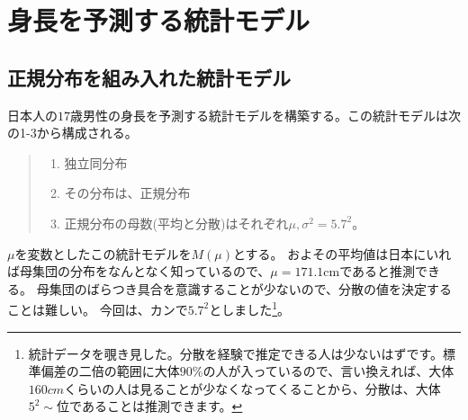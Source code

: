 
\chapter{身長を予測する統計モデル}
\section{正規分布を組み入れた統計モデル}
日本人の$17$歳男性の身長を予測する統計モデルを構築する。この統計モデルは次の1-3から構成される。
\begin{quote}
 \begin{enumerate}[(1)]
  \item 独立同分布
  \item その分布は、正規分布
  \item 正規分布の母数(平均と分散)はそれぞれ$\mu,\sigma^2=5.7^2$。
 \end{enumerate}
\end{quote}

$\mu$を変数としたこの統計モデルを$M(\mu)$とする。
およその平均値は日本にいれば母集団の分布をなんとなく知っているので、$\mu=171.1\mathrm{cm}$であると推測できる。
母集団のばらつき具合を意識することが少ないので、分散の値を決定することは難しい。
今回は、カンで$5.7^2$としました\footnote{統計データを覗き見した。分散を経験で推定できる人は少ないはずです。標準偏差の二倍の範囲に大体$90\%$の人が入っているので、言い換えれば、大体$160cm$くらいの人は見ることが少なくなってくることから、分散は、大体$5^2\sim $位であることは推測できます。}。


